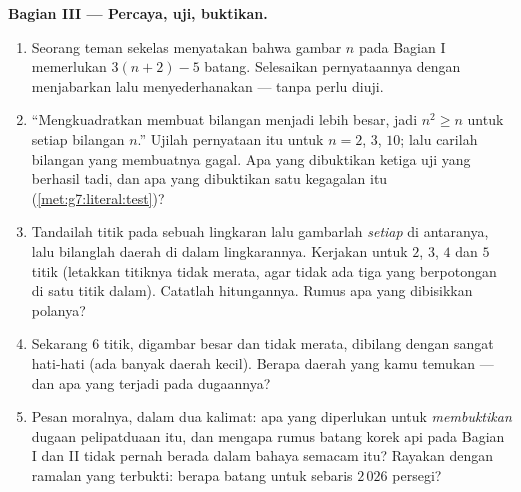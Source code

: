 \begin{problem}
\medskip
\noindent\textbf{Bagian III --- Percaya, uji, buktikan.}
\begin{enumerate}[resume]
  \item Seorang teman sekelas menyatakan bahwa gambar $n$ pada Bagian
        I memerlukan $3(n + 2) - 5$ batang. Selesaikan pernyataannya
        dengan menjabarkan lalu menyederhanakan --- tanpa perlu diuji.
  \item ``Mengkuadratkan membuat bilangan menjadi lebih besar, jadi
        $n^2 \geq n$ untuk setiap bilangan $n$.'' Ujilah pernyataan
        itu untuk $n = 2$, $3$, $10$; lalu carilah bilangan yang
        membuatnya gagal. Apa yang dibuktikan ketiga uji yang
        berhasil tadi, dan apa yang dibuktikan satu kegagalan itu
        (\cref{met:g7:literal:test})?
  \item Tandailah titik pada sebuah lingkaran lalu gambarlah
        \emph{setiap}  di antaranya, lalu bilanglah daerah
        di dalam lingkarannya. Kerjakan untuk $2$, $3$, $4$ dan $5$
        titik (letakkan titiknya tidak merata, agar tidak ada tiga
         yang berpotongan di satu titik dalam). Catatlah
        hitungannya. Rumus apa yang dibisikkan polanya?
  \item Sekarang $6$ titik, digambar besar dan tidak merata, dibilang
        dengan sangat hati-hati (ada banyak daerah kecil). Berapa
        daerah yang kamu temukan --- dan apa yang terjadi pada
        dugaannya?
  \item Pesan moralnya, dalam dua kalimat: apa yang diperlukan untuk
        \emph{membuktikan} dugaan pelipatduaan itu, dan mengapa rumus
        batang korek api pada Bagian I dan II tidak pernah berada
        dalam bahaya semacam itu? Rayakan dengan ramalan yang
        terbukti: berapa batang untuk sebaris $2\,026$ persegi?

\end{enumerate}
\end{problem}
